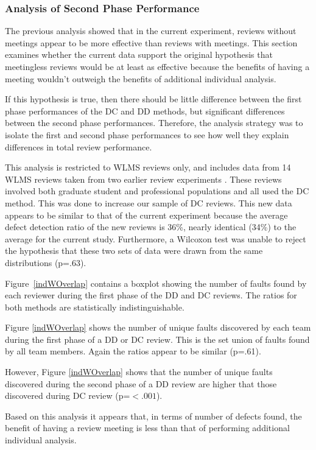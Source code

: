 \subsubsection{Analysis of Second Phase Performance}

The previous analysis showed that in the current experiment, reviews
without meetings appear to be more effective than reviews with meetings.
This section examines whether the current data support 
the original hypothesis that meetingless reviews would
be at least as effective because the benefits of having a meeting wouldn't
outweigh the benefits of additional individual analysis. 

If this hypothesis is true, then there should be little difference
between the first phase performances of the DC and DD methods, but 
significant differences between the second phase performances.
Therefore, the analysis strategy was to isolate the first and second phase 
performances to see how well they explain differences in total review
performance. 

This analysis is restricted to WLMS reviews only,
and includes data from 14 WLMS reviews taken from two earlier 
review experiments \cite{PV:TR}. These reviews involved both 
graduate student and professional populations and all used the DC method. 
This was done to increase our sample of DC reviews. 
This new data appears to be similar to that of the current experiment
because the average defect detection ratio of the new reviews is 
36\%, nearly identical (34\%) to the average for the current study. 
Furthermore, a Wilcoxon test was unable to reject the hypothesis 
that these two sets of data were drawn from the same distributions (p=.63).  

Figure~\ref{indWOverlap} contains a boxplot showing the
number of faults found by each reviewer during the 
first phase of the DD and DC reviews. The ratios 
for both methods are statistically indistinguishable.

%

Figure \ref{indWOverlap} shows the number of unique faults 
discovered by each team during the first phase of a DD or DC
review. This is the set union of faults found by all team 
members. Again the ratios appear to be similar (p=.61). 

However, Figure \ref{indWOverlap} shows that the number of 
unique faults discovered during the second phase of a DD 
review are higher that those discovered during DC review
(p=$<.001$). 
 
Based on this analysis it appears that, in terms of number of
defects found, the benefit of having a review meeting is less
than that of performing additional individual analysis. 

